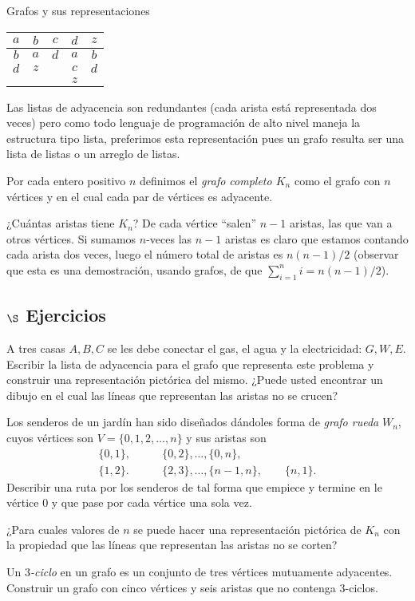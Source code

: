 \begin{section}{Grafos y sus representaciones}
\begin{center}
\begin{tabular}{ccccc}
$a$&$b$&$c$&$d$&$z$ \\ \hline
$b$&$a$&$d$&$a$&$b$ \\
$d$&$z$&&$c$&$d$\\
&&&$z$&
\end{tabular}
\end{center}

Las listas de adyacencia son redundantes (cada arista está representada dos veces) pero como todo lenguaje de programación de alto nivel maneja la estructura tipo lista,  preferimos esta representación pues  un grafo  resulta ser una lista de listas  o un  arreglo de listas.  


\begin{ejemplo*}
Por cada entero positivo $n$ definimos el \textit{grafo completo   $K_n$} como el grafo con $n$ vértices y en el cual cada par de vértices es adyacente. 

¿Cuántas aristas tiene $K_n$? De cada vértice ``salen'' $n-1$ aristas, las que van a otros vértices. Si  sumamos $n$-veces las $n-1$ aristas es claro que estamos contando cada arista dos veces, luego el número total de aristas es $n(n-1)/2$ (observar que esta es una demostración, usando  grafos, de que $\sum_{i=1}^n i = n(n-1)/2$).
\end{ejemplo*}

\subsection*{$\S$ Ejercicios}
\begin{enumex}
\item A tres casas $A,B,C$ se les debe conectar el gas, el agua y la electricidad: $G,W,E$. Escribir la lista de adyacencia para el grafo que representa este problema y construir una representación pictórica del mismo. ¿Puede usted encontrar un dibujo en el cual las líneas que representan las aristas no se crucen?
\item Los senderos de un jardín han sido diseñados dándoles forma de \textit{grafo rueda} $W_n$, cuyos vértices son $V=\{0,1,2,\ldots,n\}$ y sus aristas son
$$
\begin{aligned}
\{0,1\},\qquad &\{0,2\},\ldots,\{0,n\}, \\
\{1,2\}.\qquad &\{2,3\},\ldots,\{n-1,n\},\qquad \{n,1\}.
\end{aligned}
$$
Describir una ruta por los senderos de tal forma que empiece y termine en le vértice $0$ y que pase por cada vértice una sola vez. \item  ¿Para cuales valores de $n$ se puede hacer una representación pictórica
de $K_n$ con la propiedad que las líneas que representan las aristas no se corten? 
\item Un \textit{{$3$-ciclo}} en un grafo es un conjunto de tres vértices mutuamente adyacentes. Construir un grafo con cinco vértices y seis aristas que no contenga $3$-ciclos.
\end{enumex}

\end{section}


